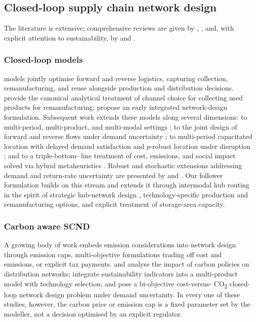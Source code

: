 \subsection{Closed-loop supply chain network design}
\label{sec:lit:scnd}

The \SCND literature is extensive; comprehensive reviews are given
by \citet{melo2009}, \citet{farahani2014}, and, with explicit
attention to sustainability, by \citet{eskandarpour2015} and
\citet{govindan2015}.

\subsubsection{Closed-loop models}
\label{sec:lit:closedloop_models}

\CLSC models jointly optimise
forward and reverse logistics, capturing collection,
remanufacturing, and reuse alongside production and distribution
decisions. \citet{savaskan2004} provide the canonical analytical
treatment of channel choice for collecting used products for
remanufacturing; \citet{fleischmann2001} propose an early integrated
network-design formulation. Subsequent work extends these models along
several dimensions: to multi-period, multi-product, and multi-modal
settings \citep{pishvaee2010, ozceylan2014}; to the joint design of
forward and reverse flows under demand uncertainty
\citep{cardoso2013}; to multi-period capacitated location with
delayed demand satisfaction \citep{correia2014} and $p$-robust
location under disruption \citep{snyder2006}; and to a triple-bottom-
line treatment of cost, emissions, and social impact solved via
hybrid metaheuristics \citep{devika2014}. Robust and stochastic
extensions addressing demand and return-rate uncertainty are
presented by \citet{pishvaee2011} and \citet{keyvanshokooh2016}. Our
follower formulation builds on this stream and extends it through
intermodal hub routing in the spirit of strategic hub-network design
\citep{yildiz2021}, technology-specific production and
remanufacturing options, and explicit treatment of storage-area
capacity.

\subsubsection{Carbon aware SCND}
\label{sec:lit:carbon_aware}

A growing body of work embeds
emission considerations into network design through emission caps,
multi-objective formulations trading off cost and emissions, or
explicit tax payments. \citet{chaabane2012} and
\citet{fahimnia2013} analyse the impact of carbon policies on
distribution networks; \citet{mota2018} integrate sustainability
indicators into a multi-product \CLSC model with technology
selection; and \citet{zhen2019} pose a bi-objective cost-versus-
CO\textsubscript{2} closed-loop network design problem under demand
uncertainty. In every one of these studies, however, the carbon
price or emission cap is a fixed parameter set by the modeller, not a
decision optimised by an explicit regulator.

